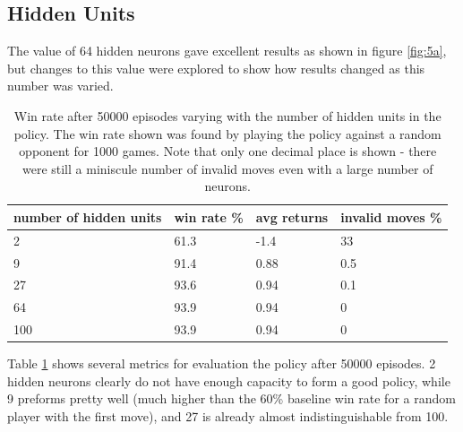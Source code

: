 \documentclass{article}
\renewcommand{\arraystretch}{1.25}
\begin{document}
   \subsection{Hidden Units}
   The value of 64 hidden neurons gave excellent results as shown in figure \ref{fig:5a}, but changes to this value
   were explored to show how results changed as this number was varied.
      \begin{table}[h]
         \centering
         \renewcommand{\arraystretch}{1.5}

         \begin{tabular}{ p{7em}|l|l|l }
            \hline
            number of hidden units     &     win rate \% & avg returns & invalid moves \%   \\
            \hline \hline
            2     &  61.3   & -1.4   &  33    \\
            9     &  91.4   & 0.88   &  0.5   \\
            27    &  93.6   & 0.94   &  0.1   \\
            64    &  93.9   & 0.94   &  0     \\
            100   &  93.9   & 0.94   &  0     \\
            \hline
         \end{tabular}

         \caption{ Win rate after 50000 episodes varying with the number of hidden units in the policy. The win rate
                  shown was found by playing the policy against a random opponent for 1000 games. Note that only
                  one decimal place is shown - there were still a miniscule number of invalid moves even with a
                  large number of neurons. }
         \label{table:part5b}
      \end{table}
   Table \ref{table:part5b} shows several metrics for evaluation the policy after 50000 episodes. 2 hidden neurons
   clearly do not have enough capacity to form a good policy, while 9 preforms pretty well (much higher than the
   60\% baseline win rate for a random player with the first move), and 27 is already almost indistinguishable from 100.
\end{document}
